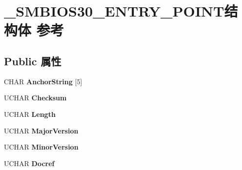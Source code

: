 \hypertarget{struct___s_m_b_i_o_s30___e_n_t_r_y___p_o_i_n_t}{}\section{\+\_\+\+S\+M\+B\+I\+O\+S30\+\_\+\+E\+N\+T\+R\+Y\+\_\+\+P\+O\+I\+N\+T结构体 参考}
\label{struct___s_m_b_i_o_s30___e_n_t_r_y___p_o_i_n_t}
\subsection*{Public 属性}
\begin{DoxyCompactItemize}
\item 
\mbox{\label{struct___s_m_b_i_o_s30___e_n_t_r_y___p_o_i_n_t_a3a48b79624bdf560bd92b16eab7d8775}} 
C\+H\+AR {\bfseries Anchor\+String} \mbox{[}5\mbox{]}
\item 
\mbox{\label{struct___s_m_b_i_o_s30___e_n_t_r_y___p_o_i_n_t_a258bbca54b050b9952111ebcf253fcc6}} 
U\+C\+H\+AR {\bfseries Checksum}
\item 
\mbox{\label{struct___s_m_b_i_o_s30___e_n_t_r_y___p_o_i_n_t_a4638026736b0f249da32d2360db06c89}} 
U\+C\+H\+AR {\bfseries Length}
\item 
\mbox{\label{struct___s_m_b_i_o_s30___e_n_t_r_y___p_o_i_n_t_a8ee383ccad556ae80a1ce3d828f4a75d}} 
U\+C\+H\+AR {\bfseries Major\+Version}
\item 
\mbox{\label{struct___s_m_b_i_o_s30___e_n_t_r_y___p_o_i_n_t_a9eeca3925cf164faf512610aa81db0c8}} 
U\+C\+H\+AR {\bfseries Minor\+Version}
\item 
\mbox{\label{struct___s_m_b_i_o_s30___e_n_t_r_y___p_o_i_n_t_a0e1ebd5e8c2da8b4fce07d51378c3555}} 
U\+C\+H\+AR {\bfseries Docref}
\item 
\mbox{\label{struct___s_m_b_i_o_s30___e_n_t_r_y___p_o_i_n_t_afe835fb9ba0f26ac01bb56344dcca4c7}} 

\end{DoxyCompactItemize}
